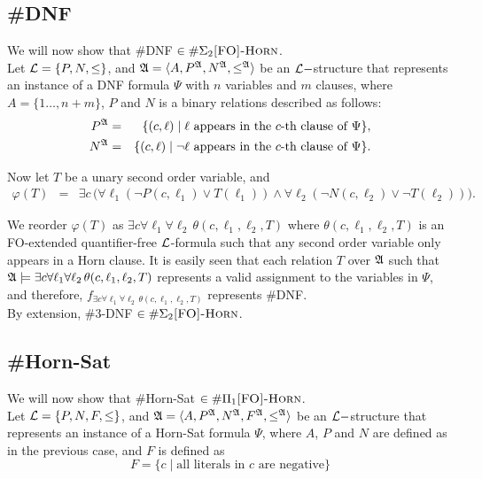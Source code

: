 \subsection{{\sc \#DNF}} \label{dnfdef}
We will now show that {\sc \#DNF} $\in\#\Sigma_2\textsc{[FO]-Horn}$.\\

Let ${\cal L} = \{P,N,\leq\}$, and ${\frak A} = \langle A, P^{\frak A}, N^{\frak A}, \leq^{\frak A} \rangle$ be an ${\cal L}-$structure that represents an instance of a {\sc DNF} formula $\Psi$ with $n$ variables and $m$ clauses, where $A = \{1\ldots,n+m\}$, $P$ and $N$ is a binary relations described as follows:
\begin{eqnarray*}
P^{\frak A} &=& \{(c,\ell)\mid \ell \mbox{ appears in the $c$-th clause of }\Psi\},\\
N^{\frak A} &=& \{(c,\ell)\mid \neg \ell \mbox{ appears in the $c$-th clause of }\Psi\}.
\end{eqnarray*}

Now let $T$ be a unary second order variable, and
\begin{eqnarray*}
\varphi(T) &=& \exists c \,\Big(\forall \ell_1 (\neg P(c,\ell_1) \vee T(\ell_1)) \wedge \forall \ell_2 (\neg N(c,\ell_2) \vee \neg T(\ell_2))\Big). 
\end{eqnarray*}

We reorder $\varphi(T)$ as $\exists c \forall \ell_1 \forall \ell_2\, \theta(c,\ell_1,\ell_2,T)$ where $\theta(c,\ell_1,\ell_2,T)$ is an {\sc FO}-extended quantifier-free ${\cal L}$-formula such that any second order variable only appears in a Horn clause. It is easily seen that each relation $T$ over ${\frak A}$ such that ${\frak A}\models \exists c \forall \ell_1 \forall \ell_2\, \theta(c,\ell_1,\ell_2,T)$ represents a valid assignment to the variables in $\Psi$, and therefore, $f_{\exists c \forall \ell_1 \forall \ell_2\, \theta(c,\ell_1,\ell_2,T)}$ represents {\sc \#DNF}.\\

By extension, {\sc \#3-DNF} $\in\#\Sigma_2\textsc{[FO]-Horn}$.

\subsection{{\sc \#Horn-Sat}}
We will now show that {\sc \#Horn-Sat} $\in\#\Pi_1\textsc{[FO]-Horn}$.\\

Let ${\cal L} = \{P,N,F,\leq\}$, and ${\frak A} = \langle A, P^{\frak A}, N^{\frak A}, F^{\frak A}, \leq^{\frak A} \rangle$ be an ${\cal L}-$structure that represents an instance of a {\sc Horn-Sat} formula $\Psi$, where $A$, $P$ and $N$ are defined as in the previous case, and $F$ is defined as
\[
	F = \{ c \mid
		\mbox{all literals in $c$ are negative}
	\}
\]

